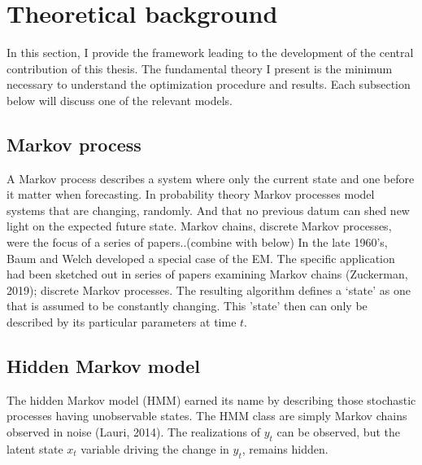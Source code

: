 \documentclass[12pt, letterpaper]{article}
\begin{document}
	
\section{Theoretical background}
In this section, I provide the framework leading to the development of the central contribution of this thesis. The fundamental theory I present is the minimum necessary to understand the optimization procedure and results. Each subsection below will discuss one of the relevant models. 
	
	\subsection{Markov process}
A Markov process describes a system where only the current state and one before it matter when forecasting. In probability theory Markov processes model systems that are changing, randomly. And that no previous datum can shed new light on the expected future state. Markov chains, discrete Markov processes, were the focus of a series of papers..(combine with below) 
In the late 1960’s, Baum and Welch developed a special case of the EM. The specific application had been sketched out in series of papers examining Markov chains (Zuckerman, 2019); discrete Markov processes. The resulting algorithm defines a ‘state’ as one that is assumed to be constantly changing. This 'state' then can only be described by its particular parameters at time $t$.
	
	\subsection{Hidden Markov model} 
The hidden Markov model (HMM) earned its name by describing those stochastic processes having unobservable states. The HMM class are simply Markov chains observed in noise (Lauri, 2014). The realizations of $y_t$ can be observed, but the latent state $x_t$ variable driving the change in $y_t$, remains hidden.   
	
\end{document}
